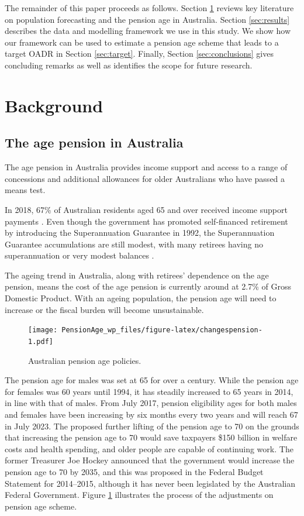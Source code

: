 \documentclass[11pt,a4paper,]{article}
\begin{document}
The remainder of this paper proceeds as follows. Section \ref{sec:litreview} reviews key literature on population forecasting and the pension age in Australia. Section \ref{sec:results} describes the data and modelling framework we use in this study. We show how our framework can be used to estimate a pension age scheme that leads to a target OADR in Section \ref{sec:target}. Finally, Section \ref{sec:conclusions} gives concluding remarks as well as identifies the scope for future research.

\hypertarget{sec:litreview}{%
\section{Background}\label{sec:litreview}}

\hypertarget{the-age-pension-in-australia}{%
\subsection{The age pension in Australia}\label{the-age-pension-in-australia}}

The age pension in Australia provides income support and access to a range of concessions and additional allowances for older Australians who have passed a means test.

In 2018, 67\% of Australian residents aged 65 and over received income support payments \autocite{AIHW19}. Even though the government has promoted self-financed retirement by introducing the Superannuation Guarantee in 1992, the Superannuation Guarantee accumulations are still modest, with many retirees having no superannuation or very modest balances \autocite{data61}.

The ageing trend in Australia, along with retirees' dependence on the age pension, means the cost of the age pension is currently around at 2.7\% of Gross Domestic Product. With an ageing population, the pension age will need to increase or the fiscal burden will become unsustainable.

\begin{figure}
\centering
\texttt{[image: PensionAge\_wp\_files/figure-latex/changespension-1.pdf]}
\caption{\label{fig:changespension}Australian pension age policies.}
\end{figure}

The pension age for males was set at 65 for over a century. While the pension age for females was 60 years until 1994, it has steadily increased to 65 years in 2014, in line with that of males. From July 2017, pension eligibility ages for both males and females have been increasing by six months every two years and will reach 67 in July 2023. The \textcite{PC13} proposed further lifting of the pension age to 70 on the grounds that increasing the pension age to 70 would save taxpayers \$150 billion in welfare costs and health spending, and older people are capable of continuing work. The former Treasurer Joe Hockey announced that the government would increase the pension age to 70 by 2035, and this was proposed in the Federal Budget Statement for 2014--2015, although it has never been legislated by the Australian Federal Government. Figure \ref{fig:changespension} illustrates the process of the adjustments on pension age scheme.
\end{document}
